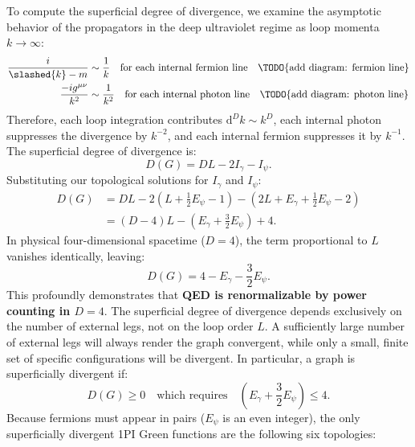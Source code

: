 To compute the superficial degree of divergence, we examine the asymptotic behavior of the propagators in the deep ultraviolet regime as loop momenta $k \to \infty$:
\[
    \begin{aligned}
        \frac{i}{\slashed{k} - m} & \sim \frac{1}{k} \quad \text{for each internal fermion line} \quad \text{\TODO{add diagram: fermion line}} \\
        \frac{-ig^{\mu\nu}}{k^2}  & \sim \frac{1}{k^2} \quad \text{for each internal photon line} \quad \text{\TODO{add diagram: photon line}}
    \end{aligned}
\]
Therefore, each loop integration contributes $\mathrm{d}^D k \sim k^D$, each internal photon suppresses the divergence by $k^{-2}$, and each internal fermion suppresses it by $k^{-1}$. The superficial degree of divergence is:
\[
    D(G) = D L - 2I_{\gamma} - I_{\psi}.
\]
Substituting our topological solutions for $I_\gamma$ and $I_\psi$:
\[
    \begin{aligned}
        D(G) & = DL - 2\left(L + \frac{1}{2}E_{\psi} - 1\right) - \left(2L + E_{\gamma} + \frac{1}{2}E_{\psi} - 2\right) \\
             & = (D - 4)L - \left( E_{\gamma} + \frac{3}{2}E_{\psi} \right) + 4.
    \end{aligned}
\]
In physical four-dimensional spacetime ($D=4$), the term proportional to $L$ vanishes identically, leaving:
\[
    D(G) = 4 - E_{\gamma} - \frac{3}{2}E_{\psi}.
\]
This profoundly demonstrates that \textbf{QED is renormalizable by power counting in $D=4$}. The superficial degree of divergence depends exclusively on the number of external legs, not on the loop order $L$. A sufficiently large number of external legs will always render the graph convergent, while only a small, finite set of specific configurations will be divergent. In particular, a graph is superficially divergent if:
\[
    D(G) \geq 0 \quad \text{which requires} \quad \left(E_{\gamma} + \frac{3}{2} E_{\psi}\right) \leq 4.
\]
Because fermions must appear in pairs ($E_\psi$ is an even integer), the only superficially divergent 1PI Green functions are the following six topologies:


